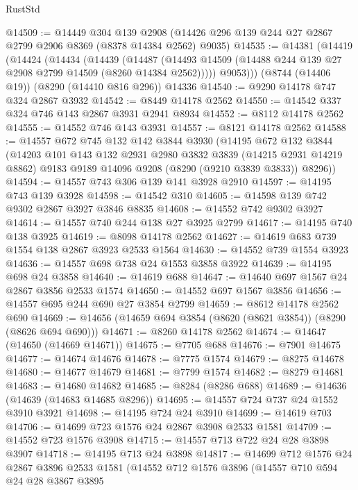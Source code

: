 \begin{lexlean}{RustStd}
\begin{coremodule}
@14509 := @14449
    @304
    @139
    @2908
    (@14426 @296 @139 @244 @27 @2867 @2799 @2906 @8369 (@8378 @14384 @2562) @9035)
@14535 := @14381
    (@14419
      (@14424
        (@14434
          (@14439
            (@14487 (@14493 @14509 (@14488 @244 @139 @27 @2908 @2799 @14509 (@8260 @14384 @2562)))))
          @9053)))
    (@8744 (@14406 @19))
    (@8290 (@14410 @816 @296))
    @14336
@14540 := @9290 @14178 @747 @324 @2867 @3932
@14542 := @8449 @14178 @2562
@14550 := @14542 @337 @324 @746 @143 @2867 @3931 @2941 @8934
@14552 := @8112 @14178 @2562
@14555 := @14552 @746 @143 @3931
@14557 := @8121 @14178 @2562
@14588 := @14557
    @672
    @745
    @132
    @142
    @3844
    @3930
    (@14195
      @672
      @132
      @3844
      (@14203
        @101
        @143
        @132
        @2931
        @2980
        @3832
        @3839
        (@14215 @2931 @14219 @8862)
        @9183
        @9189
        @14096
        @9208
        (@8290 (@9210 @3839 @3833))
        @8296))
@14594 := @14557 @743 @306 @139 @141 @3928 @2910
@14597 := @14195 @743 @139 @3928
@14598 := @14542 @310
@14605 := @14598 @139 @742 @9302 @2867 @3927 @3846 @8835
@14608 := @14552 @742 @9302 @3927
@14614 := @14557 @740 @244 @138 @27 @3925 @2799
@14617 := @14195 @740 @138 @3925
@14619 := @8098 @14178 @2562
@14627 := @14619 @683 @739 @1554 @138 @2867 @3923 @2533 @1564
@14630 := @14552 @739 @1554 @3923
@14636 := @14557 @698 @738 @24 @1553 @3858 @3922
@14639 := @14195 @698 @24 @3858
@14640 := @14619 @688
@14647 := @14640 @697 @1567 @24 @2867 @3856 @2533 @1574
@14650 := @14552 @697 @1567 @3856
@14656 := @14557 @695 @244 @690 @27 @3854 @2799
@14659 := @8612 @14178 @2562 @690
@14669 := @14656 (@14659 @694 @3854 (@8620 (@8621 @3854)) (@8290 (@8626 @694 @690)))
@14671 := @8260 @14178 @2562
@14674 := @14647 (@14650 (@14669 @14671))
@14675 := @7705 @688
@14676 := @7901 @14675
@14677 := @14674 @14676
@14678 := @7775 @1574
@14679 := @8275 @14678
@14680 := @14677 @14679
@14681 := @7799 @1574
@14682 := @8279 @14681
@14683 := @14680 @14682
@14685 := @8284 (@8286 @688)
@14689 := @14636 (@14639 (@14683 @14685 @8296))
@14695 := @14557 @724 @737 @24 @1552 @3910 @3921
@14698 := @14195 @724 @24 @3910
@14699 := @14619 @703
@14706 := @14699 @723 @1576 @24 @2867 @3908 @2533 @1581
@14709 := @14552 @723 @1576 @3908
@14715 := @14557 @713 @722 @24 @28 @3898 @3907
@14718 := @14195 @713 @24 @3898
@14817 := @14699
    @712
    @1576
    @24
    @2867
    @3896
    @2533
    @1581
    (@14552
      @712
      @1576
      @3896
      (@14557
        @710
        @594
        @24
        @28
        @3867
        @3895

\end{coremodule}
\end{lexlean}

